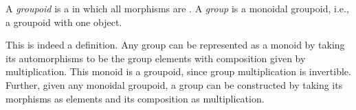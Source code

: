 


\begin{dfn*}\label{cat:groupoid}
	A \emph{groupoid} is a  in which all morphisms are
	. A \emph{group} is a monoidal groupoid, i.e., a
	groupoid with one object.
\end{dfn*}

This is indeed a definition. Any group can be represented as a monoid by taking
its automorphisms to be the group elements with composition given by
multiplication. This monoid is a groupoid, since group multiplication is
invertible. Further, given any monoidal groupoid, a group can be constructed by
taking its morphisms as elements and its composition as multiplication.


